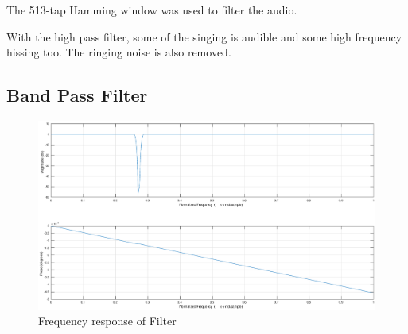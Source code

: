 \documentclass{article}
\begin{document}
The 513-tap Hamming window was used to filter the audio.

With the high pass filter, some of the singing is audible and some high frequency hissing too. The ringing noise is also removed.

\subsection*{Band Pass Filter}

\begin{figure}[H]
    \centering
    \includegraphics[width=\textwidth]{hamming_bsf}
    \caption{Frequency response of Filter}
    \label{fig:filt2}
\end{figure}
\end{document}
